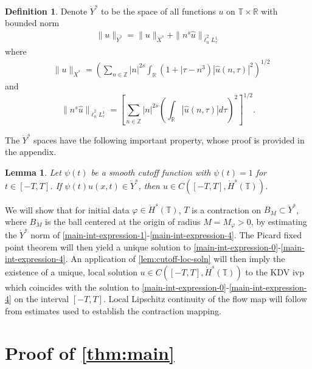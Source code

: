 \documentclass[12pt,reqno]{amsart}
\numberwithin{equation}{section}  %
\numberwithin{figure}{section}
\newcommand{\rr}{\mathbb{R}}
\newcommand{\zz}{\mathbb{Z}}
\newcommand{\ci}{\mathbb{T}}
\newcommand{\zzdot}{\dot{\zz}}
\newcommand{\wh}{\widehat}
\newcommand{\vp}{\varphi}
\theoremstyle{plain}
\newtheorem{lemma}{Lemma}
\theoremstyle{definition}
\newtheorem{definition}{Definition}
\theoremstyle{remark}
\begin{document}
\begin{definition}
	Denote $\dot{Y}^s$ to be the space of all
	functions $u$ on $\ci \times \rr$ with
	bounded norm
\begin{equation}
	\label{Y-s-norm}
	\begin{split}
		\|u\|_{\dot{Y}^s} = \|u\|_{\dot{X}^s} + \|n^s \wh{ u}\|_{ \dot{\ell}^2_n L^1_\tau }
	\end{split}
\end{equation}
%
%
%
%
where
%
\begin{equation}
	\label{X^s-norm}
	\begin{split}
		& \|u\|_{\dot{X}^s}
		= \left ( \sum_{n\in \zz} |n|^{2s} \int_\rr \left ( 1 + | 
		\tau - n^3 \right ) | \wh{u} ( n, \tau ) |^2
		\right )^{1/2}
	\end{split}
\end{equation}
and
%
%
\begin{equation}
	\label{E-norm}
	\|n^s \wh{u}\|_{ \dot{\ell}^2_n L^1_\tau } = \left[ \sum_{n \in \zzdot}| n |^{2s} \left(
	\int_{\rr}| \wh{u}(n, \tau) |d \tau \right)^{2} \right]^{1/2}.
\end{equation}
%
%
%
%
\end{definition}
The $\dot{Y}^s$ spaces have the following important property, whose proof
is provided in the appendix.
\begin{lemma}
	\label{lem:cutoff-loc-soln}
	Let $\psi(t)$ be a smooth cutoff function with $\psi(t) =1$ for $t \in [-T, T]$. If
	$\psi(t)u(x,t) \in \dot{Y}^s$, then $u \in C([-T, T], \dot{H}^s(\ci))$.
\end{lemma}
%
%
We will 
show that for initial data $\vp \in \dot{H}^s(\ci)$, $T$ is a contraction on $B_M 
\subset \dot{Y}^s$, where $B_M$ is the ball centered at the origin of radius $M = 
M_{\vp}> 0$, by estimating the $\dot{Y}^s$
norm of \eqref{main-int-expression-1}-\eqref{main-int-expression-4}. The 
Picard fixed point theorem will
then yield a unique solution to
\eqref{main-int-expression-0}-\eqref{main-int-expression-4}. An application of
\autoref{lem:cutoff-loc-soln} will then imply the existence of a unique, local
solution $u \in C([-T, T], \dot{H}^s(\ci))$ to the KDV ivp which coincides with the solution to
\eqref{main-int-expression-0}-\eqref{main-int-expression-4} on the interval $[-T, T]$. Local Lipschitz continuity of the flow map will follow
from estimates used to establish the contraction mapping. %
%
%
%
%
%
%
%
\section{Proof of \autoref{thm:main}}
%
%
%
%
%
%
%
%
%
%
%
\end{document}
